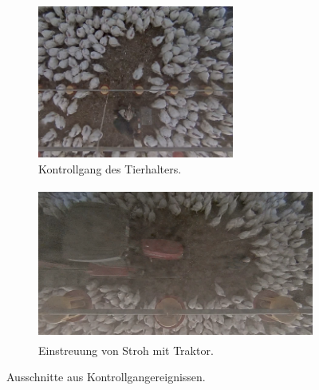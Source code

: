 \begin{figure}[htb]
     \centering
     \begin{subfigure}[b]{0.4\textwidth}
         \centering
         \includegraphics[width=\textwidth, height=5cm]{img/Verhaltensweisen/Kontrollgang Tierhalter Traube 2.png}
         \caption{Kontrollgang des Tierhalters.}
     \end{subfigure}
     \hfill
     \begin{subfigure}[b]{0.59\textwidth}
         \centering
         \includegraphics[width=\textwidth, height=5cm]{img/Verhaltensweisen/Kontrollgang Tracktor Traube.png}
         \caption{Einstreuung von Stroh mit Traktor.}
     \end{subfigure}
     \caption[Ausschnitte aus Kontrollgangereignissen.]{Ausschnitte aus Kontrollgangereignissen.}
     \label{fig:bspKontrollg}
\end{figure}


\par

